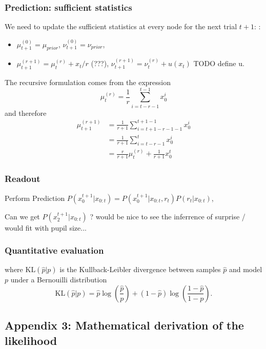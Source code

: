 \documentclass[12pt,english]{article}%
\newcommand{\KL}[2]{\text{KL}( #1 | #2 )}
\newcommand{\pa}[1]{\left( #1 \right)}
\newcommand{\eq}[1]{\begin{equation*}#1\end{equation*}}
\newcommand{\eqs}[1]{\begin{align*}#1\end{align*}}
\newcommand{\seeApp}[1]{Appendix~\ref{app:#1}}
\begin{document}
\subsubsection{Prediction: sufficient statistics}
We need to update the sufficient statistics at every node for the next trial $t+1$:
:
	\begin{itemize}
		\item    $\mu^{(0)}_{t+1} = \mu_{prior}$, $\nu^{(0)}_{t+1} = \nu_{prior}$,
		\item    $\mu^{(r+1)}_{t+1} = \mu^{(r)}_{t} + x_t/r$ (???), $\nu^{(r+1)}_{t+1} = \nu^{(r)}_{t} + u(x_t)$ TODO define u.
	\end{itemize}


The recursive formulation comes from the expression
\eq{
\mu^{(r)}_{t} = \frac 1 r \sum_{i=t-r-1}^{t-1} x_0^i
}
and therefore
\eqs{
\mu^{(r+1)}_{t+1} 	&= \frac{1}{r+1} \sum_{i=t+1-r-1-1}^{t+1-1} x_0^i \\
					&= \frac{1}{r+1} \sum_{i=t-r-1}^{t} x_0^i \\
					&= \frac{r}{r+1} \mu^{(r)}_{t} + \frac{1}{r+1} x_0^t
}

\subsubsection{Readout}
\label{app:readout}

Perform Prediction $P (x_0^{t+1} | x_{0:t}) = P (x_0^{t+1}|x_{0:t} , r_t) P (r_t|x_{0:t})$,

Can we get  $P (x_2^{t+1} | x_{0:t}) $ ? would be nice to see the inferrence of surprise / would fit with pupil size...

\subsubsection{Quantitative evaluation}

where $\KL{\hat p}{p}$ is the Kullback-Leibler divergence between samples $\hat p$ and model $p$ under a Bernouilli distribution
\begin{equation}
\KL{\hat p}{p} = \hat{p} \log\pa{\frac{\hat p}{p}} + (1-\hat p) \log\pa{\frac{1-\hat p}{1-p}}.
\end{equation}


\subsection{Appendix 3: Mathematical derivation of the likelihood}
\label{app:likelihood}
\end{document}
